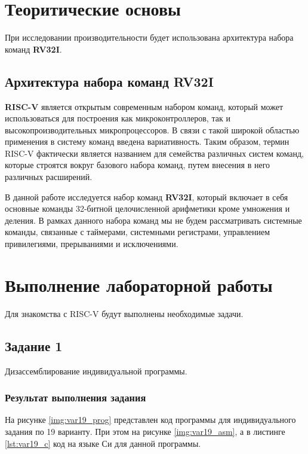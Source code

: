 \chapter{Теоритические основы}
При исследовании производительности будет использована архитектура набора команд \textbf{RV32I}. 

\section{Архитектура набора команд RV32I}

\textbf{RISC-V} является открытым современным набором команд, который может использоваться для построения как микроконтроллеров, так и высокопроизводительных микропроцессоров. В связи с такой широкой областью применения в систему команд введена вариативность. Таким образом, термин RISC-V фактически является названием для семейства различных систем команд, которые строятся вокруг базового набора команд, путем внесения в него различных расширений.

В данной работе исследуется набор команд \textbf{RV32I}, который включает в себя основные
команды 32-битной целочисленной арифметики кроме умножения и деления. В рамках
данного набора команд мы не будем рассматривать системные команды, связанные с
таймерами, системными регистрами, управлением привилегиями, прерываниями и исключениями.


\chapter{Выполнение лабораторной работы}

Для знакомства с RISC-V будут выполнены необходимые задачи.

\section{Задание 1}

Дизассемблирование индивидуальной программы.

\subsection{Результат выполнения задания}

На рисунке \ref{img:var19_prog} представлен код программы для индивидуального задания по 19 варианту. При этом на рисунке \ref{img:var19_asm}, а в листинге \ref{lst:var19_c} код на языке Си для данной программы. 


